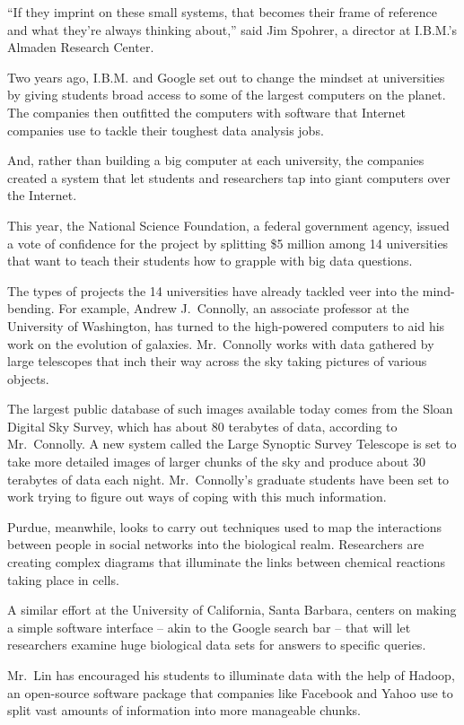 ﻿\documentclass[12pt]{article}
\begin{document}
``If they imprint on these small systems, that becomes their frame of reference and what they're
always thinking about,'' said Jim Spohrer, a director at I.B.M.'s Almaden Research Center.

Two years ago, I.B.M. and Google set out to change the mindset at universities by giving students
broad access to some of the largest computers on the planet. The companies then outfitted the
computers with software that Internet companies use to tackle their toughest data analysis jobs.

And, rather than building a big computer at each university, the companies created a system that let
students and researchers tap into giant computers over the Internet.

This year, the National Science Foundation, a federal government agency, issued a vote of confidence
for the project by splitting \$5 million among 14 universities that want to teach their students how
to grapple with big data questions.

The types of projects the 14 universities have already tackled veer into the mind-bending. For
example, Andrew J.~Connolly, an associate professor at the University of Washington, has turned to
the high-powered computers to aid his work on the evolution of galaxies. Mr.~Connolly works with
data gathered by large telescopes that inch their way across the sky taking pictures of various
objects.

The largest public database of such images available today comes from the Sloan Digital Sky Survey,
which has about 80 terabytes of data, according to Mr.~Connolly. A new system called the Large
Synoptic Survey Telescope is set to take more detailed images of larger chunks of the sky and
produce about 30 terabytes of data each night. Mr.~Connolly's graduate students have been set to
work trying to figure out ways of coping with this much information.

Purdue, meanwhile, looks to carry out techniques used to map the interactions between people in
social networks into the biological realm. Researchers are creating complex diagrams that illuminate
the links between chemical reactions taking place in cells.

A similar effort at the University of California, Santa Barbara, centers on making a simple software
interface -- akin to the Google search bar -- that will let researchers examine huge biological data
sets for answers to specific queries.

Mr.~Lin has encouraged his students to illuminate data with the help of Hadoop, an open-source
software package that companies like Facebook and Yahoo use to split vast amounts of information
into more manageable chunks.
\end{document}
